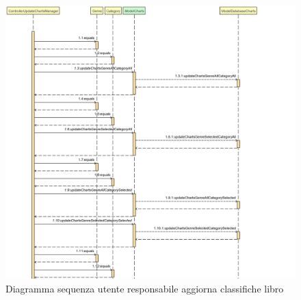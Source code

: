 \documentclass[a4paper,11pt]{report}
\begin{document}
\clearpage
\begin{figure}[h!]
    	\centering
    	\hspace*{-0.2in}
    	\includegraphics[width=1.3\linewidth]{Sequence diagrams/3 Manager/updateChartsManager.png}
    	\caption{Diagramma sequenza utente responsabile aggiorna classifiche libro}
    \end{figure}
    
\end{document}
